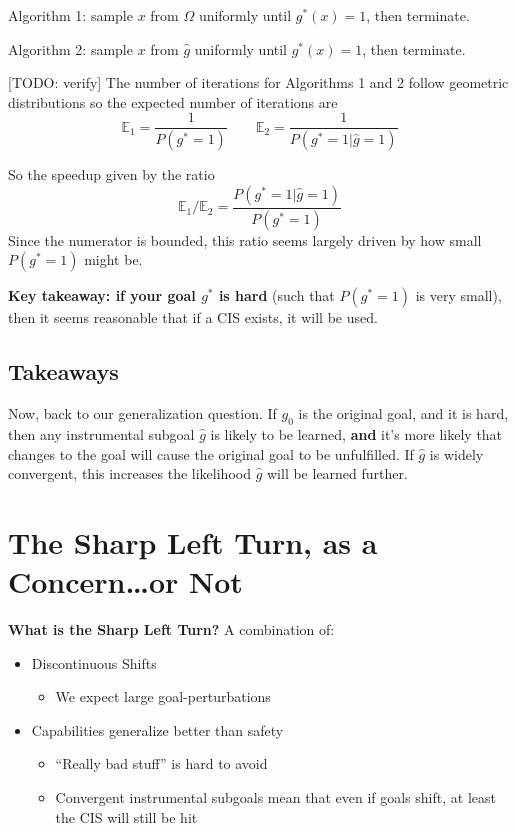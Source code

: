 \documentclass{article}
\begin{document}
Algorithm 1: sample $x$ from $\Omega$ uniformly until $g^*(x)=1$, then terminate.

Algorithm 2: sample $x$ from $\hat{g}$ uniformly until $g^*(x)=1$, then terminate.

[TODO: verify] The number of iterations for Algorithms 1 and 2 follow geometric distributions so the expected number of iterations are 
\[
\mathbb{E}_1 = \frac{1}{P(g^*=1)} \qquad \mathbb{E}_2 = \frac{1}{P(g^*=1|\hat{g}=1)}    
\]

So the speedup given by the ratio
\[
\mathbb{E}_1 / \mathbb{E}_2 = \frac{P(g^*=1|\hat{g}=1)}{P(g^*=1)}
\]
Since the numerator is bounded, this ratio seems largely driven by how small $P(g^*=1)$ might be.

\textbf{Key takeaway: if your goal $g^*$ is hard} (such that $P(g^*=1)$ is very small), then it seems reasonable that if a CIS exists, it will be used.

\subsection{Takeaways}
Now, back to our generalization question. If $g_0$ is the original goal, and it is hard, then any instrumental subgoal $\hat{g}$ is likely to be learned, \textbf{and} it's more likely that changes to the goal will cause the original goal to be unfulfilled. If $\hat{g}$ is widely convergent, this increases the likelihood $\hat{g}$ will be learned further.


\section{The Sharp Left Turn, as a Concern\ldots or Not}
\textbf{What is the Sharp Left Turn?} A combination of:
\begin{itemize}
    \item Discontinuous Shifts
    \begin{itemize}
        \item We expect large goal-perturbations
    \end{itemize}
    \item Capabilities generalize better than safety
    \begin{itemize}
        \item “Really bad stuff” is hard to avoid
        \item Convergent instrumental subgoals mean that even if goals shift, at least the CIS will still be hit
    \end{itemize}
\end{itemize}
\end{document}
